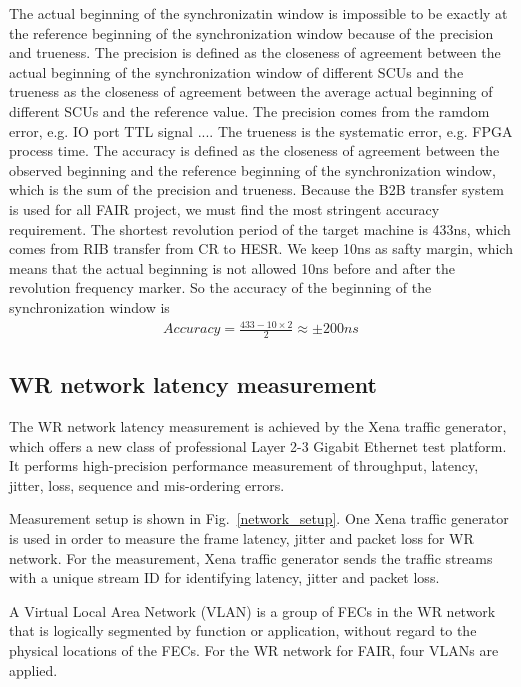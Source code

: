 The actual beginning of the synchronizatin window is impossible to be exactly at the reference beginning of the synchronization window because of the precision and trueness. The precision is defined as the closeness of agreement between the actual beginning of the synchronization window of different SCUs and the trueness as the closeness of agreement between the average actual beginning of different SCUs and the reference value. The precision comes from the ramdom error, e.g. IO port TTL signal .... The trueness is the systematic error, e.g. FPGA process time. The accuracy is defined as the closeness of agreement between the observed beginning and the reference beginning of the synchronization window, which is the sum of the precision and trueness. Because the B2B transfer system is used for all FAIR project, we must find the most stringent accuracy requirement. The shortest revolution period of the target machine is 433ns, which comes from RIB transfer from CR to HESR. We keep 10ns as safty margin, which means that the actual beginning is not allowed 10ns before and after the revolution frequency marker. So the accuracy of the beginning of the synchronization window is 
\begin{equation}
\begin{aligned}
Accuracy=\frac{433-10 \times 2}{2}\approx \pm 200ns
\end{aligned}
\end{equation}

\subsection{WR network latency measurement}
The WR network latency measurement is achieved by the Xena traffic generator, which offers a new class of professional Layer 2-3 Gigabit Ethernet test platform. It performs high-precision performance measurement of throughput, latency, jitter, loss, sequence and mis-ordering errors.

Measurement setup is shown in Fig.~\ref{network_setup}. One Xena traffic generator is used in order to measure the frame latency, jitter and packet loss for WR network. For the measurement, Xena traffic generator sends the traffic streams with a unique stream ID for identifying latency, jitter and packet loss. 

A Virtual Local Area Network (VLAN) is a group of FECs in the WR network that is logically segmented by function or application, without regard to the physical
locations of the FECs. For the WR network for FAIR, four VLANs are applied. 

